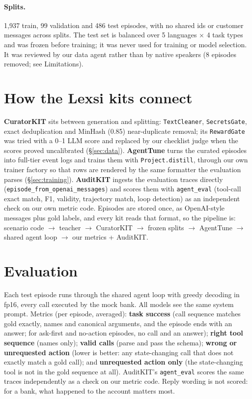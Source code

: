 \documentclass[11pt]{article}
\newcommand{\tool}[1]{\texttt{\small #1}}
\begin{document}
\paragraph{Splits.} 1,937 train, 99 validation and 486 test episodes, with no shared ids or customer messages across
splits. The test set is balanced over 5 languages $\times$ 4 task types and was frozen before training; it was never
used for training or model selection. It was reviewed by our data agent rather than by native speakers (8 episodes
removed; see Limitations).

\section{How the Lexsi kits connect}
\label{sec:kits}

\textbf{CuratorKIT} \citep{bhattacharjee2026curatorkit} sits between generation and splitting: \tool{TextCleaner}, \tool{SecretsGate}, exact
deduplication and MinHash (0.85) near-duplicate removal; its \tool{RewardGate} was tried with a 0--1 LLM score and
replaced by our checklist judge when the scores proved uncalibrated (\S\ref{sec:data}).
\textbf{AgentTune} \citep{lyngkhoi2026agenttune} turns the curated episodes into full-tier event logs and trains them with \tool{Project.distill},
through our own trainer factory so that rows are rendered by the same formatter the evaluation parses (\S\ref{sec:training}).
\textbf{AuditKIT} \citep{arora2026auditkit} ingests the evaluation traces directly (\tool{episode\_from\_openai\_messages}) and scores them with
\tool{agent\_eval} (tool-call exact match, F1, validity, trajectory match, loop detection) as an independent check on
our own metric code. Episodes are stored once, as OpenAI-style messages plus gold labels, and every kit reads that
format, so the pipeline is: scenario code $\rightarrow$ teacher $\rightarrow$ CuratorKIT $\rightarrow$ frozen splits
$\rightarrow$ AgentTune $\rightarrow$ shared agent loop $\rightarrow$ our metrics + AuditKIT.



\section{Evaluation}

Each test episode runs through the shared agent loop with greedy decoding in fp16, every call executed by the mock
bank. All models see the same system prompt. Metrics (per episode, averaged):
\textbf{task success} (call sequence matches gold exactly, names and canonical arguments, and the episode ends with an
answer; for ask-first and no-action episodes, no call and an answer);
\textbf{right tool sequence} (names only);
\textbf{valid calls} (parse and pass the schema);
\textbf{wrong or unrequested action} (lower is better: any state-changing call that does not exactly match a gold call);
and \textbf{unrequested action only} (the state-changing tool is not in the gold sequence at all).
AuditKIT's \tool{agent\_eval} scores the same traces independently as a check on our metric code. Reply wording is
not scored: for a bank, what happened to the account matters most.
\end{document}
